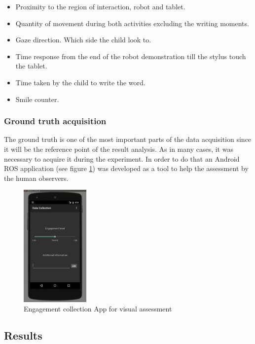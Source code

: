 \begin{itemize}
\item Proximity to the region of interaction, robot and tablet.
\item Quantity of movement during both activities excluding the writing moments.
\item Gaze direction. Which side the child look to. 
\item Time response from the end of the robot demonstration till the stylus touch the tablet.
\item Time taken by the child to write the word.
\item Smile counter.

\end{itemize}
	

\subsubsection{Ground truth acquisition}
The ground truth is one of the most important parts of the data acquisition since it will be the reference point of the result analysis. As in many cases, it was necessary to acquire it during the experiment. In order to do that an Android ROS application (see figure \ref{fig:dataCollect}) was developed as a tool to help the assessment by the human observers.


\begin{figure}[h!]
        \centering
        \includegraphics[width=0.3\textwidth]{figures/dataCollection.png}
        \caption{Engagement collection App for visual assessment}
        \label{fig:dataCollect}
\end{figure}


\subsection{Results}

